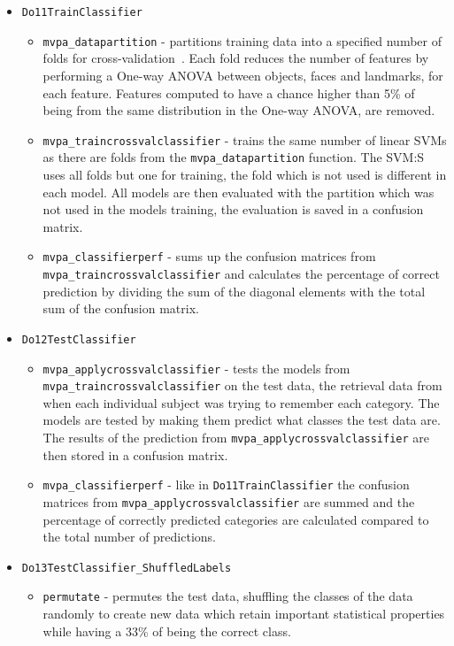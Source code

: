 \documentclass[12pt, a4paper]{article}
\begin{document}
\begin{itemize}
    \item \texttt{Do11TrainClassifier}
    \begin{itemize}
        \item \texttt{mvpa\_datapartition} - partitions training data into a specified number of folds for cross-validation~\cite{enwiki:crossvalidation}.
        Each fold reduces the number of features by performing a One-way ANOVA between objects, faces and landmarks, for each feature.
        Features computed to have a chance higher than 5\% of being from the same distribution in the One-way ANOVA, are removed.
        
        \item \texttt{mvpa\_traincrossvalclassifier} - trains the same number of linear SVMs as there are folds from the \texttt{mvpa\_datapartition} function.
        The SVM:S uses all folds but one for training, the fold which is not used is different in each model.
        All models are then evaluated with the partition which was not used in the models training, the evaluation is saved in a confusion matrix.
        
        \item \texttt{mvpa\_classifierperf} - sums up the confusion matrices from \texttt{mvpa\_traincrossvalclassifier} and calculates the percentage of correct prediction by dividing the sum of the diagonal elements with the total sum of the confusion matrix.
    \end{itemize}
    \item \texttt{Do12TestClassifier}
    \begin{itemize}
        
        \item \texttt{mvpa\_applycrossvalclassifier} - tests the models from \\
        \texttt{mvpa\_traincrossvalclassifier} on the test data, the retrieval data from when each individual subject was trying to remember each category.
        The models are tested by making them predict what classes the test data are.
        The results of the prediction from \texttt{mvpa\_applycrossvalclassifier} are then stored in a confusion matrix.
        
        \item \texttt{mvpa\_classifierperf} - like in \texttt{Do11TrainClassifier} the confusion matrices from \texttt{mvpa\_applycrossvalclassifier} are summed and the percentage of correctly predicted categories are calculated compared to the total number of predictions.
    \end{itemize}
    \item \texttt{Do13TestClassifier\_ShuffledLabels}
    \begin{itemize}
        \item \texttt{permutate} - permutes the test data, shuffling the classes of the data randomly to create new data which retain important statistical properties while having a 33\% of being the correct class.
        

\end{itemize}
\end{itemize}
\end{document}
